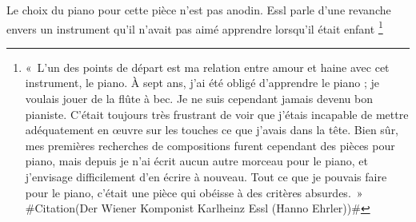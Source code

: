 \documentclass[a4paper,12pt]{article}
\newcommand{\guill}[1]{«~#1~»}
\newcommand{\zitat}[2]{\#Citation(#2)\#}
\begin{document}
Le choix du piano pour cette pièce n'est pas anodin. Essl parle d'une revanche envers un instrument qu'il n'avait pas aimé apprendre lorsqu'il était enfant
\footnote{\guill{L'un des points de départ est ma relation entre amour et haine avec cet instrument, le piano. À sept ans, j'ai été obligé d'apprendre le piano ; je voulais jouer de la flûte à bec. Je ne suis cependant jamais devenu bon pianiste. C'était toujours très frustrant de voir que j'étais incapable de mettre adéquatement en œuvre sur les touches ce que j'avais dans la tête. Bien sûr, mes premières recherches de compositions furent cependant des pièces pour piano, mais depuis je n'ai écrit aucun autre morceau pour le piano, et j'envisage difficilement d'en écrire à nouveau. Tout ce que je pouvais faire pour le piano, c'était une pièce qui obéisse à des critères absurdes.}
\zitat{Einer der Ausgangspunkt ist meine Hassliebe zu diesem Instrument, dem Klavier. Ich wurde mit sieben Jahren gezwungen, Klavier zu lernen; ich wollte Blockflöte spielen. Trotzdem war ich am Klavier nie gut. Es war immer frustrierend, zu sehen, dass ich das, was ich im Kopf hatte, auf den Tasten nicht adäquat umsetzen konnte. Meine ersten Kompositionversuche waren natürlich trotzdem Klavierstücke, aber ich habe sonst kein einziges Klavierstück geschrieben bis jetzt, und ich kann mir auch nicht vorstellen, ein Klavierstück zu schreiben. Das einzige, was mir möglich war: Ein Klavierstück zu machen, das ganz absurde Kriterien erfüllt.}
{Der Wiener Komponist Karlheinz Essl (Hanno Ehrler)}}
\end{document}
